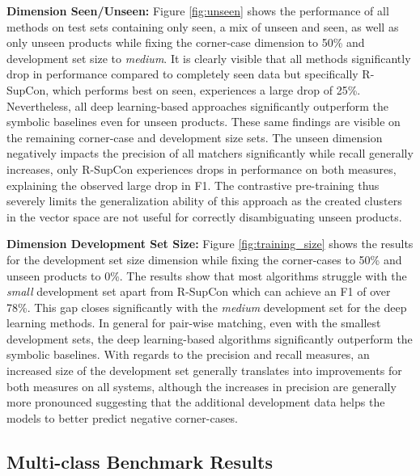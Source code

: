 \documentclass[sigconf,edbt]{acmart-edbt2024}
\begin{document}
\textbf{Dimension Seen/Unseen:} Figure \ref{fig:unseen} shows the performance of all methods on test sets containing only seen, a mix of unseen and seen, as well as only unseen products while fixing the corner-case dimension to 50\% and development set size to \textit{medium}. It is clearly visible that all methods significantly drop in performance compared to completely seen data but specifically R-SupCon, which performs best on seen, experiences a large drop of 25\%. Nevertheless, all deep learning-based approaches significantly outperform the symbolic baselines even for unseen products. These same findings are visible on the remaining corner-case and development size sets. The unseen dimension negatively impacts the precision of all matchers significantly while recall generally increases, only R-SupCon experiences drops in performance on both measures, explaining the observed large drop in F1. The contrastive pre-training thus severely limits the generalization ability of this approach as the created clusters in the vector space are not useful for correctly disambiguating unseen products.



\textbf{Dimension Development Set Size:} Figure \ref{fig:training_size} shows the results for the development set size dimension while fixing the corner-cases to 50\% and unseen products to 0\%. The results show that most algorithms struggle with the \textit{small} development set apart from R-SupCon which can achieve an F1 of over 78\%. This gap closes significantly with the \textit{medium} development set for the deep learning methods. In general for pair-wise matching, even with the smallest development sets, the deep learning-based algorithms significantly outperform the symbolic baselines. With regards to the precision and recall measures, an increased size of the development set generally translates into improvements for both measures on all systems, although the increases in precision are generally more pronounced suggesting that the additional development data helps the models to better predict negative corner-cases.



\subsection{Multi-class Benchmark Results}
\label{subsec:resultsmulti}
\end{document}
